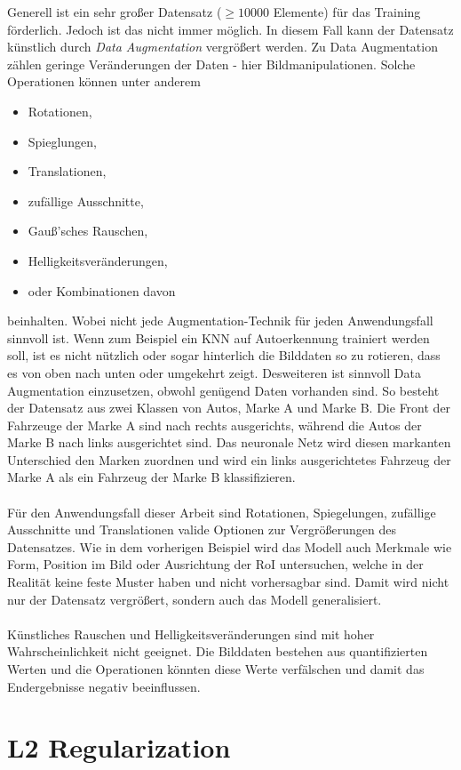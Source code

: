 Generell ist ein sehr großer Datensatz ($\ge10000$ Elemente) für das Training förderlich. Jedoch ist das nicht immer möglich. In diesem Fall kann der Datensatz künstlich durch \textit{Data Augmentation} vergrößert werden. Zu Data Augmentation zählen geringe Veränderungen der Daten - hier Bildmanipulationen. Solche Operationen können unter anderem
\begin{itemize}
	\item Rotationen,
	\item Spieglungen,
	\item Translationen,
	\item zufällige Ausschnitte,
	\item Gauß'sches Rauschen,
	\item Helligkeitsveränderungen,
	\item oder Kombinationen davon
\end{itemize}
beinhalten. Wobei nicht jede Augmentation-Technik für jeden Anwendungsfall sinnvoll ist. Wenn zum Beispiel ein KNN auf Autoerkennung trainiert werden soll, ist es nicht nützlich oder sogar hinterlich die Bilddaten so zu rotieren, dass es von oben nach unten oder umgekehrt zeigt. Desweiteren ist sinnvoll Data Augmentation einzusetzen, obwohl genügend Daten vorhanden sind. So besteht der Datensatz aus zwei Klassen von Autos, Marke A und Marke B. Die Front der Fahrzeuge der Marke A sind nach rechts ausgerichts, während die Autos der Marke B nach links ausgerichtet sind. Das neuronale Netz wird diesen markanten Unterschied den Marken zuordnen und wird ein links ausgerichtetes Fahrzeug der Marke A als ein Fahrzeug der Marke B klassifizieren. 
\\\\
Für den Anwendungsfall dieser Arbeit sind Rotationen, Spiegelungen, zufällige Ausschnitte und Translationen valide Optionen zur Vergrößerungen des Datensatzes. Wie in dem vorherigen Beispiel wird das Modell auch Merkmale wie Form, Position im Bild oder Ausrichtung der RoI untersuchen, welche in der Realität keine feste Muster haben und nicht vorhersagbar sind. Damit wird nicht nur der Datensatz vergrößert, sondern auch das Modell generalisiert.
\\\\
Künstliches Rauschen und Helligkeitsveränderungen sind mit hoher Wahrscheinlichkeit nicht geeignet. Die Bilddaten bestehen aus quantifizierten Werten und die Operationen könnten diese Werte verfälschen und damit das Endergebnisse negativ beeinflussen.

\section{L2 Regularization}

